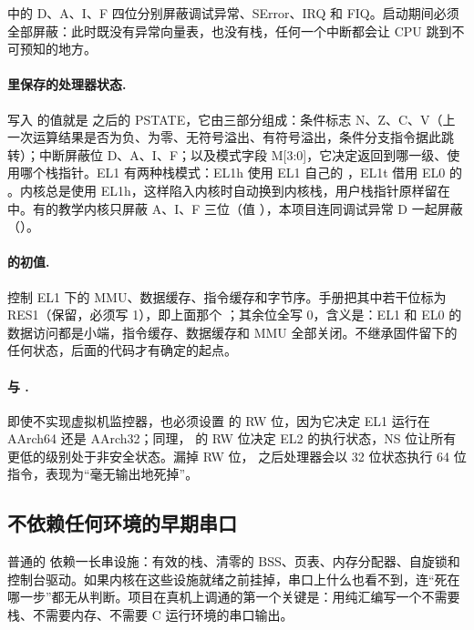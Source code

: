  中的 D、A、I、F 四位分别屏蔽调试异常、SError、IRQ 和 FIQ。启动期间必须全部屏蔽：此时既没有异常向量表，也没有栈，任何一个中断都会让 CPU 跳到不可预知的地方。

\paragraph{ 里保存的处理器状态.} 写入  的值就是  之后的 PSTATE，它由三部分组成：条件标志 N、Z、C、V（上一次运算结果是否为负、为零、无符号溢出、有符号溢出，条件分支指令据此跳转）；中断屏蔽位 D、A、I、F；以及模式字段 M[3:0]，它决定返回到哪一级、使用哪个栈指针。EL1 有两种栈模式：EL1h 使用 EL1 自己的 ，EL1t 借用 EL0 的 。内核总是使用 EL1h，这样陷入内核时自动换到内核栈，用户栈指针原样留在  中。有的教学内核只屏蔽 A、I、F 三位（值 ），本项目连同调试异常 D 一起屏蔽（）。

\paragraph{ 的初值.}  控制 EL1 下的 MMU、数据缓存、指令缓存和字节序。手册把其中若干位标为 RES1（保留，必须写 1），即上面那个 ；其余位全写 0，含义是：EL1 和 EL0 的数据访问都是小端，指令缓存、数据缓存和 MMU 全部关闭。不继承固件留下的任何状态，后面的代码才有确定的起点。

\paragraph{ 与 .} 即使不实现虚拟机监控器，也必须设置  的 RW 位，因为它决定 EL1 运行在 AArch64 还是 AArch32；同理， 的 RW 位决定 EL2 的执行状态，NS 位让所有更低的级别处于非安全状态。漏掉 RW 位， 之后处理器会以 32 位状态执行 64 位指令，表现为“毫无输出地死掉”。

\subsection{不依赖任何环境的早期串口}
\label{sec:early-uart}

普通的  依赖一长串设施：有效的栈、清零的 BSS、页表、内存分配器、自旋锁和控制台驱动。如果内核在这些设施就绪之前挂掉，串口上什么也看不到，连“死在哪一步”都无从判断。项目在真机上调通的第一个关键是：用纯汇编写一个不需要栈、不需要内存、不需要 C 运行环境的串口输出。

